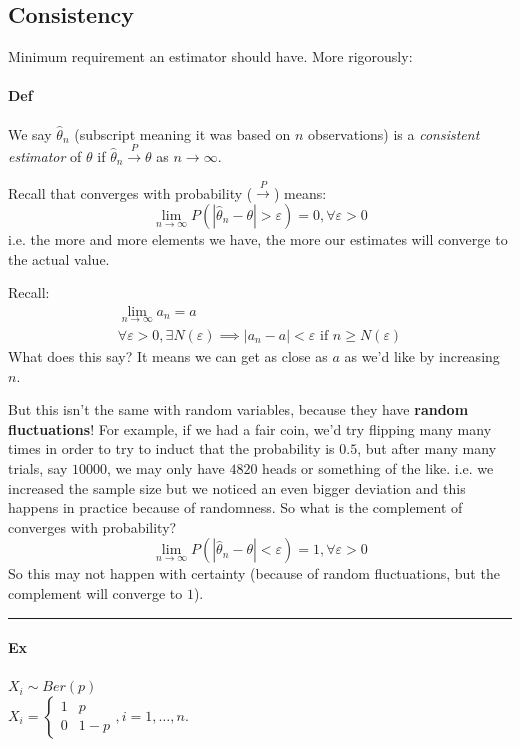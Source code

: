 \documentclass[12 pt]{article}
\begin{document}
  \subsection{Consistency}
  Minimum requirement an estimator should have. More rigorously:
  \paragraph{Def} We say $\hat{\theta}_n$ (subscript meaning it was
  based on $n$ observations) is a \textit{consistent estimator} of
  $\theta$ if $\hat{\theta}_n \stackrel{P}{\to} \theta$ as
  $n\to\infty$.

  Recall that converges with probability ($\stackrel{P}{\to}$) means:
  $$\lim_{n\to\infty}P(|\hat{\theta}_n - \theta| > \varepsilon) = 0,
  \forall \varepsilon > 0$$
  i.e. the more and more elements we have, the more our estimates will
  converge to the actual value.

  Recall:
  \begin{align*}
    \lim_{n \to \infty} a_n = a
    \\ \forall \varepsilon >0, \exists N(\varepsilon) \implies |a_n -
    a| < \varepsilon \text{ if }n \geq N(\varepsilon)
  \end{align*}
  What does this say? It means we can get as close as $a$ as we'd like
  by increasing $n$.

  But this isn't the same with random variables, because they have
  \textbf{random fluctuations}! For example, if we had a fair coin,
  we'd try flipping many many times in order to try to induct that the
  probability is $0.5$, but after many many trials, say $10000$, we
  may only have $4820$ heads or something of the like. i.e. we
  increased the sample size but we noticed an even bigger deviation
  and this happens in practice because of randomness. So what is the
  complement of converges with probability?
  $$\lim_{n \to \infty} P(|\hat{\theta}_n - \theta| < \varepsilon) =
  1, \forall \varepsilon >0$$
  So this may not happen with certainty (because of random
  fluctuations, but the complement will converge to $1$).
  \\ \noindent \rule{\textwidth}{0.5pt}
  \paragraph{Ex}
  $X_i \sim Ber(p)$
  \\ $X_i =
  \begin{cases}
    1 & p
    \\ 0 & 1-p
  \end{cases}, i=1,\ldots,n
  $.
\end{document}
